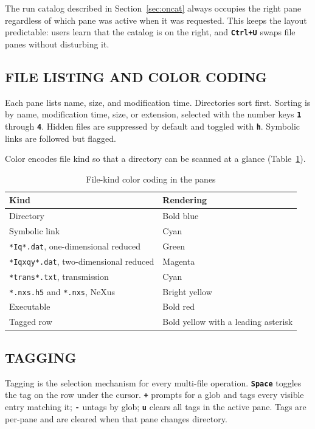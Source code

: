 \documentclass[tm]{ornltm}
\newcommand{\key}[1]{\textbf{\texttt{#1}}}
\begin{document}
The run catalog described in Section~\ref{sec:oncat} always occupies the right
pane regardless of which pane was active when it was requested. This keeps the
layout predictable: users learn that the catalog is on the right, and \key{Ctrl+U}
swaps file panes without disturbing it.

\subsection{FILE LISTING AND COLOR CODING}

Each pane lists name, size, and modification time. Directories sort first.
Sorting is by name, modification time, size, or extension, selected with the
number keys \key{1} through \key{4}. Hidden files are suppressed by default and
toggled with \key{h}. Symbolic links are followed but flagged.

Color encodes file kind so that a directory can be scanned at a glance
(Table~\ref{tab:colors}).

\begin{table}[ht]
  \centering
  \caption{File-kind color coding in the panes}
  \label{tab:colors}
  \small
  \begin{tabular}{l l}
    \toprule
    Kind & Rendering \\
    \midrule
    Directory & Bold blue \\
    Symbolic link & Cyan \\
    \texttt{*Iq*.dat}, one-dimensional reduced & Green \\
    \texttt{*Iqxqy*.dat}, two-dimensional reduced & Magenta \\
    \texttt{*trans*.txt}, transmission & Cyan \\
    \texttt{*.nxs.h5} and \texttt{*.nxs}, NeXus & Bright yellow \\
    Executable & Bold red \\
    Tagged row & Bold yellow with a leading asterisk \\
    \bottomrule
  \end{tabular}
\end{table}

\subsection{TAGGING}

Tagging is the selection mechanism for every multi-file operation.
\key{Space} toggles the tag on the row under the cursor. \key{+} prompts for a
glob and tags every visible entry matching it; \key{-} untags by glob; \key{u}
clears all tags in the active pane. Tags are per-pane and are cleared when that
pane changes directory.
\end{document}
